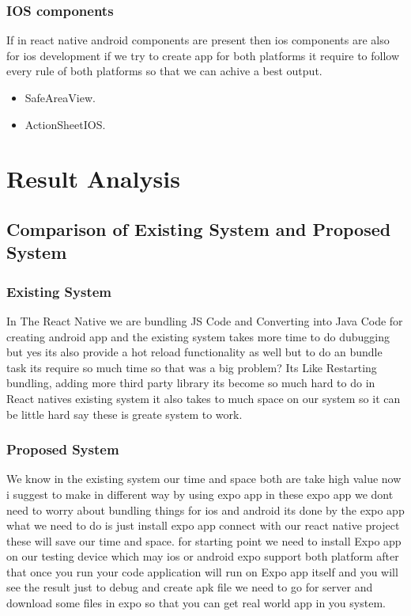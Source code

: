 \documentclass[12pt,a4paper]{report}
\begin{document}
\subsection{IOS components}
If in react native android components are present then ios components are also for ios development if we try to create app for both platforms it require to follow every rule of both platforms so that we can achive a best output.

\begin{itemize}
  \item SafeAreaView.
  \item ActionSheetIOS.
\end{itemize}

\newpage

\chapter{Result Analysis}
\section{Comparison of Existing System and Proposed System}
\subsection{ Existing System}
In The React Native we are bundling JS Code and Converting into Java Code for creating android app and the existing system takes more time to do dubugging but yes its also provide a hot reload functionality as well but to do an bundle task its require so much time so that was a big problem? Its Like Restarting bundling, adding more third party library its become so much hard to do in React natives existing system it also takes to much space on our system so it can be little hard say these is greate system to work.

\subsection{Proposed System}
We know in the existing system our time and space both are take high value now i suggest to make in different way by using expo app in these expo app we dont need to worry about bundling things for ios and android its done by the expo app what we need to do is just install expo app connect with our react native project these will save our time and space. for starting point we need to install Expo app on our testing device which may ios or android expo support both platform after that once you run your code application will run on Expo app itself and you will see the result just to debug and create apk file we need to go for server and download some files in expo so that you can get real world app in you system.
\end{document}

